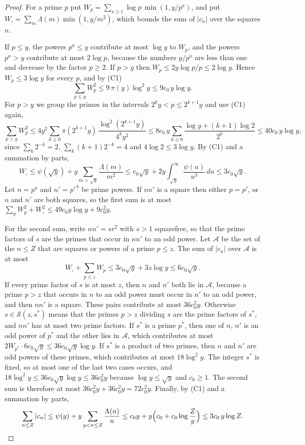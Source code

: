 \documentclass[11pt,letterpaper]{article}
\numberwithin{equation}{section}
\begin{document}
\begin{proof}
For a prime $p$ put $W_p=\sum_{a\ge1}\log p\,\min(1,y/p^a)$, and put $W_\square=\sum_m\Lambda(m)\min(1,y/m^2)$, which bounds the sum of $|c_n|$ over the squares $n$.

If $p\le y$, the powers $p^a\le y$ contribute at most $\log y$ to $W_p$, and the powers $p^a>y$ contribute at most $2\log p$, because the numbers $y/p^a$ are less than one and decrease by the factor $p\ge2$. If $p>y$ then $W_p\le2y\log p/p\le2\log y$. Hence $W_p\le3\log y$ for every $p$, and by (C1)
\[
\sum_{p\le y}W_p^2\le9\,\pi(y)\log^2y\le9c_0\,y\log y .
\]
For $p>y$ we group the primes in the intervals $2^ky<p\le2^{k+1}y$ and use (C1) again,
\[
\sum_{p>y}W_p^2\le4y^2\sum_{k\ge0}\pi(2^{k+1}y)\,\frac{\log^2(2^{k+1}y)}{4^ky^2}\le8c_0\,y\sum_{k\ge0}\frac{\log y+(k+1)\log2}{2^k}\le40c_0\,y\log y ,
\]
since $\sum_k2^{-k}=2$, $\sum_k(k+1)2^{-k}=4$ and $4\log2\le3\log y$. By (C1) and a summation by parts,
\[
W_\square\le\psi(\sqrt y)+y\sum_{m>\sqrt y}\frac{\Lambda(m)}{m^2}\le c_0\sqrt y+2y\int_{\sqrt y}^\infty\frac{\psi(u)}{u^3}\,du\le3c_0\sqrt y .
\]
Let $n=p^a$ and $n'=p'^{\,b}$ be prime powers. If $nn'$ is a square then either $p=p'$, or $n$ and $n'$ are both squares, so the first sum is at most $\sum_pW_p^2+W_\square^2\le49c_0y\log y+9c_0^2y$.

For the second sum, write $nn'=sr^2$ with $s>1$ squarefree, so that the prime factors of $s$ are the primes that occur in $nn'$ to an odd power. Let $\mathcal A$ be the set of the $n\le Z$ that are squares or powers of a prime $p\le z$. The sum of $|c_n|$ over $\mathcal A$ is at most
\[
W_\square+\sum_{p\le z}W_p\le3c_0\sqrt y+3z\log y\le6c_0\sqrt y .
\]
If every prime factor of $s$ is at most $z$, then $n$ and $n'$ both lie in $\mathcal A$, because a prime $p>z$ that occurs in $n$ to an odd power must occur in $n'$ to an odd power, and then $nn'$ is a square. These pairs contribute at most $36c_0^2y$. Otherwise $s\in\mathcal S(z,s^\ast)$ means that the primes $p>z$ dividing $s$ are the prime factors of $s^\ast$, and $nn'$ has at most two prime factors. If $s^\ast$ is a prime $p^\ast$, then one of $n$, $n'$ is an odd power of $p^\ast$ and the other lies in $\mathcal A$, which contributes at most $2W_{p^\ast}\cdot6c_0\sqrt y\le36c_0\sqrt y\log y$. If $s^\ast$ is a product of two primes, then $n$ and $n'$ are odd powers of these primes, which contributes at most $18\log^2y$. The integer $s^\ast$ is fixed, so at most one of the last two cases occurs, and $18\log^2y\le36c_0\sqrt y\log y\le36c_0^2y$ because $\log y\le\sqrt y$ and $c_0\ge1$. The second sum is therefore at most $36c_0^2y+36c_0^2y=72c_0^2y$. Finally, by (C1) and a summation by parts,
\[
\sum_{n\le Z}|c_n|\le\psi(y)+y\sum_{y<n\le Z}\frac{\Lambda(n)}n\le c_0y+y\Big(c_0+c_0\log\frac Zy\Big)\le3c_0\,y\log Z .\qedhere
\]
\end{proof}
\end{document}
